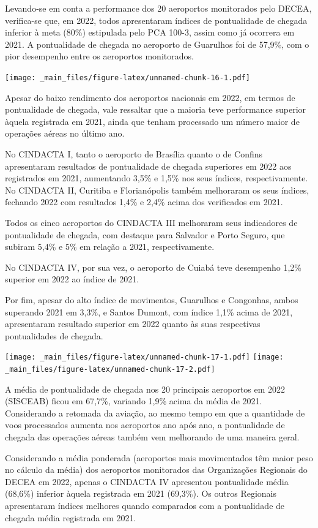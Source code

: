 \documentclass[
]{book}
\begin{document}
Levando-se em conta a performance dos 20 aeroportos monitorados pelo DECEA, verifica-se que, em 2022, todos apresentaram índices de pontualidade de chegada inferior à meta (80\%) estipulada pelo PCA 100-3, assim como já ocorrera em 2021. A pontualidade de chegada no aeroporto de Guarulhos foi de 57,9\%, com o pior desempenho entre os aeroportos monitorados.

\texttt{[image: \_main\_files/figure-latex/unnamed-chunk-16-1.pdf]}

Apesar do baixo rendimento dos aeroportos nacionais em 2022, em termos de pontualidade de chegada, vale ressaltar que a maioria teve performance superior àquela registrada em 2021, ainda que tenham processado um número maior de operações aéreas no último ano.

No CINDACTA I, tanto o aeroporto de Brasília quanto o de Confins apresentaram resultados de pontualidade de chegada superiores em 2022 aos registrados em 2021, aumentando 3,5\% e 1,5\% nos seus índices, respectivamente.
No CINDACTA II, Curitiba e Florianópolis também melhoraram os seus índices, fechando 2022 com resultados 1,4\% e 2,4\% acima dos verificados em 2021.

Todos os cinco aeroportos do CINDACTA III melhoraram seus indicadores de pontualidade de chegada, com destaque para Salvador e Porto Seguro, que subiram 5,4\% e 5\% em relação a 2021, respectivamente.

No CINDACTA IV, por sua vez, o aeroporto de Cuiabá teve desempenho 1,2\% superior em 2022 ao índice de 2021.

Por fim, apesar do alto índice de movimentos, Guarulhos e Congonhas, ambos superando 2021 em 3,3\%, e Santos Dumont, com índice 1,1\% acima de 2021, apresentaram resultado superior em 2022 quanto às suas respectivas pontualidades de chegada.

\texttt{[image: \_main\_files/figure-latex/unnamed-chunk-17-1.pdf]} \texttt{[image: \_main\_files/figure-latex/unnamed-chunk-17-2.pdf]}

A média de pontualidade de chegada nos 20 principais aeroportos em 2022 (SISCEAB) ficou em 67,7\%, variando 1,9\% acima da média de 2021. Considerando a retomada da aviação, ao mesmo tempo em que a quantidade de voos processados aumenta nos aeroportos ano após ano, a pontualidade de chegada das operações aéreas também vem melhorando de uma maneira geral.

Considerando a média ponderada (aeroportos mais movimentados têm maior peso no cálculo da média) dos aeroportos monitorados das Organizações Regionais do DECEA em 2022, apenas o CINDACTA IV apresentou pontualidade média (68,6\%) inferior àquela registrada em 2021 (69,3\%). Os outros Regionais apresentaram índices melhores quando comparados com a pontualidade de chegada média registrada em 2021.
\end{document}
